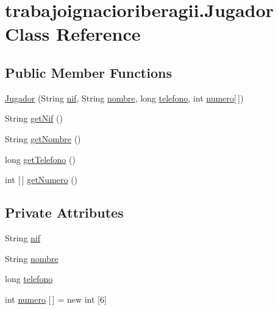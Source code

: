 \hypertarget{classtrabajoignacioriberagii_1_1_jugador}{}\section{trabajoignacioriberagii.\+Jugador Class Reference}
\label{classtrabajoignacioriberagii_1_1_jugador}
\subsection*{Public Member Functions}
\begin{DoxyCompactItemize}
\item 
\mbox{\hyperlink{classtrabajoignacioriberagii_1_1_jugador_a024a8940a1e72d329342ec04bc1caefc}{Jugador}} (String \mbox{\hyperlink{classtrabajoignacioriberagii_1_1_jugador_aae9c316bdd5626ce8e14bb067221404e}{nif}}, String \mbox{\hyperlink{classtrabajoignacioriberagii_1_1_jugador_a1c506d4c25f6c68c14b84aa80eea10b6}{nombre}}, long \mbox{\hyperlink{classtrabajoignacioriberagii_1_1_jugador_ae739daa3303ea17e6f041ad860b04b3e}{telefono}}, int \mbox{\hyperlink{classtrabajoignacioriberagii_1_1_jugador_a9c212c71c30fe0722972df3a966b5e07}{numero}}\mbox{[}$\,$\mbox{]})
\item 
String \mbox{\hyperlink{classtrabajoignacioriberagii_1_1_jugador_ac43fff55c5670037523201a992d907ca}{get\+Nif}} ()
\item 
String \mbox{\hyperlink{classtrabajoignacioriberagii_1_1_jugador_a8835058ef25d335e3177122172b46aa4}{get\+Nombre}} ()
\item 
long \mbox{\hyperlink{classtrabajoignacioriberagii_1_1_jugador_a3c851a0f1eea2ac9a92681d723e1f02f}{get\+Telefono}} ()
\item 
int \mbox{[}$\,$\mbox{]} \mbox{\hyperlink{classtrabajoignacioriberagii_1_1_jugador_a0b2046e823386e35fc21b11344eaa100}{get\+Numero}} ()
\end{DoxyCompactItemize}
\subsection*{Private Attributes}
\begin{DoxyCompactItemize}
\item 
String \mbox{\hyperlink{classtrabajoignacioriberagii_1_1_jugador_aae9c316bdd5626ce8e14bb067221404e}{nif}}
\item 
String \mbox{\hyperlink{classtrabajoignacioriberagii_1_1_jugador_a1c506d4c25f6c68c14b84aa80eea10b6}{nombre}}
\item 
long \mbox{\hyperlink{classtrabajoignacioriberagii_1_1_jugador_ae739daa3303ea17e6f041ad860b04b3e}{telefono}}
\item 
int \mbox{\hyperlink{classtrabajoignacioriberagii_1_1_jugador_a9c212c71c30fe0722972df3a966b5e07}{numero}} \mbox{[}$\,$\mbox{]} = new int \mbox{[}6\mbox{]}
\end{DoxyCompactItemize}


